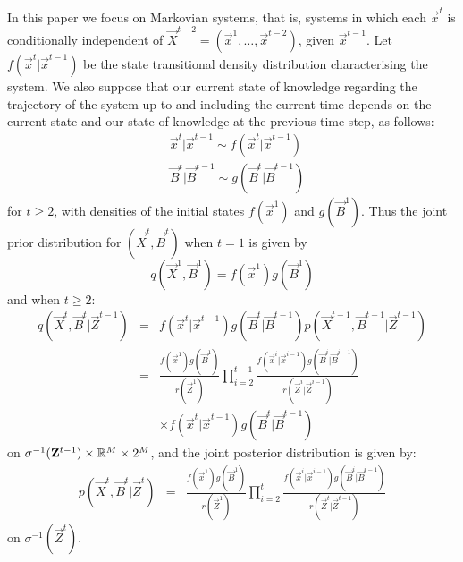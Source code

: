 In this paper we focus on Markovian systems, that is, systems in which each $\vec{x}^t$ is conditionally independent of $\vec{X}^{t-2} = (\vec{x}^1, \ldots,\vec{x}^{t-2})$, given $\vec{x}^{t-1}$. Let $f(\vec{x}^t | \vec{x}^{t-1})$ be the state transitional density distribution characterising the system. We also suppose that our current state of knowledge regarding the trajectory of the system up to and including the current time depends on the current state and our state of knowledge at the previous time step, as follows:
\begin{align*}
    &\vec{x}^t | \vec{x}^{t-1} \sim f(\vec{x}^t | \vec{x}^{t-1})\\
    &\vec{B}^t | \vec{B}^{t-1} \sim g(\vec{B}^t | \vec{B}^{t-1})
\end{align*}
for $t \geq 2$, with densities of the initial states $f(\vec{x}^1)$ and $g(\vec{B}^1)$.
Thus the joint prior distribution for $(\vec{X}^t,\vec{B}^t)$ when $t=1$ is given by 
\[
q(\vec{X}^1,\vec{B}^1) = f(\vec{x}^1)g(\vec{B}^1)
\]
and when $t \geq 2$: 
\begin{eqnarray*}
    q(\vec{X}^t, \vec{B}^t | \vec{Z}^{t-1}) &=& f(\vec{x}^t | \vec{x}^{t-1}) g(\vec{B}^t | \vec{B}^{t-1}) p(\vec{X}^{t-1}, \vec{B}^{t-1} | \vec{Z}^{t-1}) \\
& = & \frac{f(\vec{x}^1)g(\vec{B}^1)}{r(\vec{Z}^1)} \prod_{i=2}^{t-1} \frac{f(\vec{x}^i | \vec{x}^{i-1}) g(\vec{B}^i | \vec{B}^{i-1})}{r(\vec{Z}^i | \vec{Z}^{i-1})} \\
& & \times f(\vec{x}^t | \vec{x}^{t-1}) g(\vec{B}^t | \vec{B}^{t-1})
\end{eqnarray*}
on $\sigma^{-1}(\mathbf{Z}^{t-1}) \times \mathbb R^M \times 2^M$, and the joint posterior distribution is given by:
\begin{eqnarray*}
    p(\vec{X}^t, \vec{B}^t | \vec{Z}^t) 
& = & \frac{f(\vec{x}^1)g(\vec{B}^1)}{r(\vec{Z}^1)} \prod_{i=2}^t \frac{f(\vec{x}^i | \vec{x}^{i-1}) g(\vec{B}^i | \vec{B}^{i-1})}{r(\vec{Z}^t | \vec{Z}^{t-1})} 
\end{eqnarray*}
on $\sigma^{-1}(\vec{Z}^t)$.

